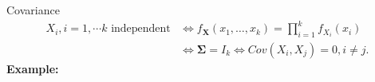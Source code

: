 \documentclass [aspectratio=169]{beamer}
\begin{document}
\begin{frame}{Covariance}
\vspace{-0.7in}
    \begin{equation*}
       \begin{aligned}
          X_i, i = 1, \cdots k \text{ independent} & \Leftrightarrow f_{\mathbf {X} }(x_{1},\ldots ,x_{k}) = \prod_{i = 1}^k f_{X_i}(x_i)\\
          & \Leftrightarrow \boldsymbol{\Sigma} = I_k \Leftrightarrow Cov(X_i, X_j) = 0, i \neq j.
       \end{aligned}
   \end{equation*}
   \vspace{0.1in}
   \textbf{Example:}\\
   \begin{itemize}
 \end{itemize}
\begin{overlayarea}{\textwidth}{2cm}
\end{overlayarea}
\end{frame}
\end{document}
